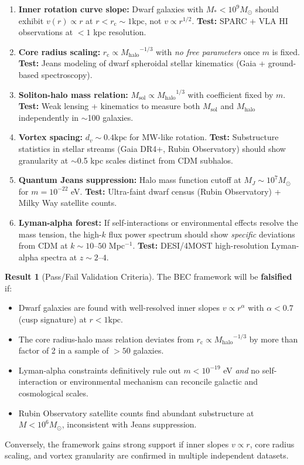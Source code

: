 \documentclass[11pt,a4paper]{article}
\newcommand{\Msun}{\ensuremath{M_\odot}}
\newcommand{\Msol}{\ensuremath{M_{\mathrm{sol}}}}
\newcommand{\Mhalo}{\ensuremath{M_{\mathrm{halo}}}}
\newcommand{\kpc}{\ensuremath{\mathrm{kpc}}}
\newcommand{\rc}{\ensuremath{r_{\mathrm{c}}}}
\theoremstyle{definition}
\newtheorem{result}{Result}[section]
\theoremstyle{remark}
\begin{document}
\begin{enumerate}[leftmargin=*, itemsep=0.5em]
\item \textbf{Inner rotation curve slope:} Dwarf galaxies with $M_* < 10^9 \Msun$ should exhibit $v(r) \propto r$ at $r < \rc \sim 1 \kpc$, not $v \propto r^{1/2}$. \textbf{Test:} SPARC + VLA HI observations at $<1$ kpc resolution.

\item \textbf{Core radius scaling:} $\rc \propto \Mhalo^{-1/3}$ with \emph{no free parameters} once $m$ is fixed. \textbf{Test:} Jeans modeling of dwarf spheroidal stellar kinematics (Gaia + ground-based spectroscopy).

\item \textbf{Soliton-halo mass relation:} $\Msol \propto \Mhalo^{1/3}$ with coefficient fixed by $m$. \textbf{Test:} Weak lensing + kinematics to measure both $\Msol$ and $\Mhalo$ independently in $\sim$100 galaxies.

\item \textbf{Vortex spacing:} $d_v \sim 0.4 \kpc$ for MW-like rotation. \textbf{Test:} Substructure statistics in stellar streams (Gaia DR4+, Rubin Observatory) should show granularity at $\sim$0.5 kpc scales distinct from CDM subhalos.

\item \textbf{Quantum Jeans suppression:} Halo mass function cutoff at $M_J \sim 10^7 \Msun$ for $m = 10^{-22}$ eV. \textbf{Test:} Ultra-faint dwarf census (Rubin Observatory) + Milky Way satellite counts.

\item \textbf{Lyman-alpha forest:} If self-interactions or environmental effects resolve the mass tension, the high-$k$ flux power spectrum should show \emph{specific} deviations from CDM at $k \sim 10$--$50$ Mpc$^{-1}$. \textbf{Test:} DESI/4MOST high-resolution Lyman-alpha spectra at $z \sim 2$--$4$.
\end{enumerate}

\begin{result}[Pass/Fail Validation Criteria]
The BEC framework will be \textbf{falsified} if:
\begin{itemize}[leftmargin=*]
\item Dwarf galaxies are found with well-resolved inner slopes $v \propto r^{\alpha}$ with $\alpha < 0.7$ (cusp signature) at $r < 1 \kpc$.
\item The core radius-halo mass relation deviates from $\rc \propto \Mhalo^{-1/3}$ by more than factor of 2 in a sample of $>50$ galaxies.
\item Lyman-alpha constraints definitively rule out $m < 10^{-19}$ eV \emph{and} no self-interaction or environmental mechanism can reconcile galactic and cosmological scales.
\item Rubin Observatory satellite counts find abundant substructure at $M < 10^6 \Msun$, inconsistent with Jeans suppression.
\end{itemize}

Conversely, the framework gains strong support if inner slopes $v \propto r$, core radius scaling, and vortex granularity are confirmed in multiple independent datasets.
\end{result}
\end{document}
